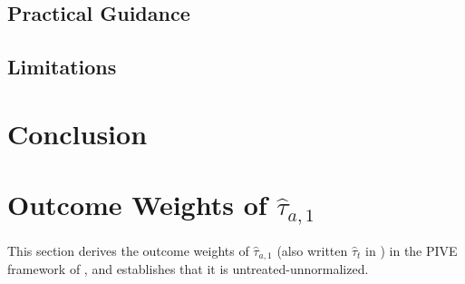 \documentclass[12pt, a4paper, oneside]{article}
\theoremstyle{plain}
\theoremstyle{definition}
\begin{document}

\subsection{Practical Guidance}
\label{subsec:practical}


\subsection{Limitations}
\label{subsec:limitations}



\section{Conclusion}
\label{sec:conclusion}



\newpage


\newpage
\appendix
\renewcommand{\thesection}{\Alph{section}}



\section{Outcome Weights of \texorpdfstring{$\hat\tau_{a,1}$}{tau(a,1)}}
\label{app:omega_a1}

This section derives the outcome weights of $\hat\tau_{a,1}$ (also written $\hat\tau_t$
in \citealt{sloczynski2025abadie}) in the PIVE framework of
\citet{knaus2024treatment}, and establishes that it is untreated-unnormalized.
\end{document}

